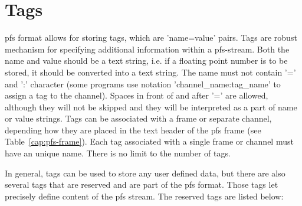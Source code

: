 \documentclass[a4paper,12pt,english]{article}
\begin{document}
\section{Tags}
\label{sec:tags}

pfs format allows for storing tags, which are 'name=value' pairs. Tags
are robust mechanism for specifying additional information within a
pfs-stream. Both the name and value should be a text string, i.e. if a
floating point number is to be stored, it should be converted into a
text string. The name must not contain '=' and ':' character (some
programs use notation 'channel\_name:tag\_name' to assign a tag to the
channel). Spaces in front of and after '=' are allowed, although they
will not be skipped and they will be interpreted as a part of name or
value strings. Tags can be associated with a frame or separate
channel, depending how they are placed in the text header of the pfs
frame (see Table~\ref{cap:pfs-frame}).  Each tag associated with a
single frame or channel must have an unique name. There is no limit to
the number of tags.

In general, tags can be used to store any user defined data, but there
are also several tags that are reserved and are part of the pfs
format. Those tags let precisely define content of the pfs stream.
The reserved tags are listed below:
\end{document}
